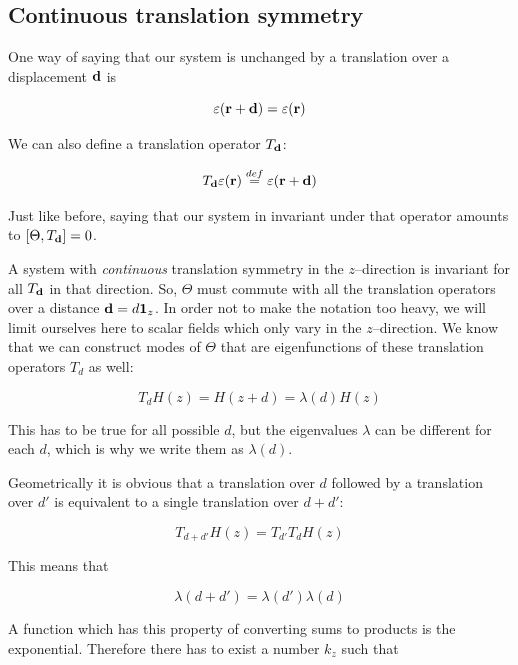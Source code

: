 \subsection{Continuous translation symmetry}

One way of saying that our system is unchanged by a translation over a displacement ${\bf d}$ is

\begin{equation}
\varepsilon ({\bf r} + {\bf d}) =  \varepsilon ({\bf r})
\end{equation} 

We can also define a translation operator $T_{\bf d}$:

\begin{equation}
T_{\bf d} \varepsilon ({\bf r}) \stackrel{def}{=} \varepsilon ({\bf r} + {\bf d})
\end{equation} 

Just like before, saying that our system in invariant under that operator amounts to $[\Theta, T_{\bf d}] = 0$.

A system with \emph{continuous} translation symmetry in the $z$--direction is invariant for all $T_{\bf d}$ in that direction. So, $\Theta$ must commute with all the translation operators over a distance ${\bf d} = d {\bf 1}_z$. In order not to make the notation too heavy, we will limit ourselves here to scalar fields which only vary in the $z$--direction.  We know that we can construct modes of $\Theta$ that are eigenfunctions of these translation operators $T_d$ as well:

\begin{equation}
T_d H(z) = H(z + d) = \lambda(d) H(z)
\end{equation} 

This has to be true for all possible $d$, but the eigenvalues $\lambda$ can be different for each $d$, which is why we write them as $\lambda(d)$. 

Geometrically it is obvious that a translation over $d$ followed by a translation over $d'$ is equivalent to a single translation over $d+d'$:

\begin{equation}
T_{d+d'}H(z) = T_{d'}T_{d}H(z)
\end{equation} 

This means that

\begin{equation}
\lambda(d + d')=\lambda(d')\lambda(d)
\end{equation} 

A function which has this property of converting sums to products is the exponential. Therefore there has to exist a number $k_z$ such that

